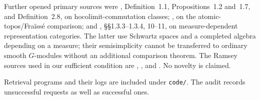 Further opened primary sources were \citet{StanculescuClasses},
Definition~1.1, Propositions~1.2 and~1.7, and Definition~2.8, on
hocolimit-commutation classes; \citet[Theorem~3.5]{Caramello2013}, on
the atomic-topos/Fra\"iss\'e comparison; and
\citet{HarmanSnowden2024}, \S\S1.3.3--1.3.4, 10--11, on
measure-dependent representation categories. The latter use Schwartz
spaces and a completed algebra depending on a measure; their
semisimplicity cannot be transferred to ordinary smooth $G$-modules
without an additional comparison theorem. The Ramsey sources used in
our sufficient condition are
\citet[Definition~2.1, Example~2.1 and \S4]{Masulovic2026},
\citet[Theorem~3.21 and Corollaries~4.2--4.3]{HubickaNesetril2019}, and
\citet[Theorem~15 and its proof]{Hubicka2025}. No novelty is claimed.

Retrieval programs and their logs are included under \texttt{code/}.
The audit records unsuccessful requests as well as successful ones.
